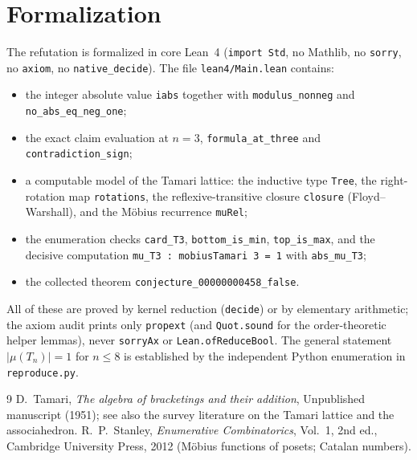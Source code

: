 \documentclass[11pt]{article}
\theoremstyle{definition}
\begin{document}
\section{Formalization}

The refutation is formalized in core Lean~4 (\texttt{import Std}, no
Mathlib, no \texttt{sorry}, no \texttt{axiom}, no \texttt{native\_decide}).
The file \texttt{lean4/Main.lean} contains:

\begin{itemize}
\item the integer absolute value \texttt{iabs} together with
\texttt{modulus\_nonneg} and \texttt{no\_abs\_eq\_neg\_one};
\item the exact claim evaluation at $n=3$,
\texttt{formula\_at\_three} and \texttt{contradiction\_sign};
\item a computable model of the Tamari lattice: the inductive type
\texttt{Tree}, the right-rotation map \texttt{rotations}, the
reflexive-transitive closure \texttt{closure} (Floyd--Warshall), and the
M\"obius recurrence \texttt{muRel};
\item the enumeration checks \texttt{card\_T3}, \texttt{bottom\_is\_min},
\texttt{top\_is\_max}, and the decisive computation
\texttt{mu\_T3 : mobiusTamari 3 = 1} with \texttt{abs\_mu\_T3};
\item the collected theorem \texttt{conjecture\_00000000458\_false}.
\end{itemize}

All of these are proved by kernel reduction (\texttt{decide}) or by
elementary arithmetic; the axiom audit prints only \texttt{propext} (and
\texttt{Quot.sound} for the order-theoretic helper lemmas), never
\texttt{sorryAx} or \texttt{Lean.ofReduceBool}. The general statement
$|\mu(T_n)|=1$ for $n\le 8$ is established by the independent Python
enumeration in \texttt{reproduce.py}.

\begin{thebibliography}{9}
 D.~Tamari, \emph{The algebra of bracketings and their
addition}, Unpublished manuscript (1951); see also the survey
literature on the Tamari lattice and the associahedron.
 R.~P.~Stanley, \emph{Enumerative Combinatorics},
Vol.~1, 2nd ed., Cambridge University Press, 2012 (M\"obius functions of
posets; Catalan numbers).
\end{thebibliography}
\end{document}
